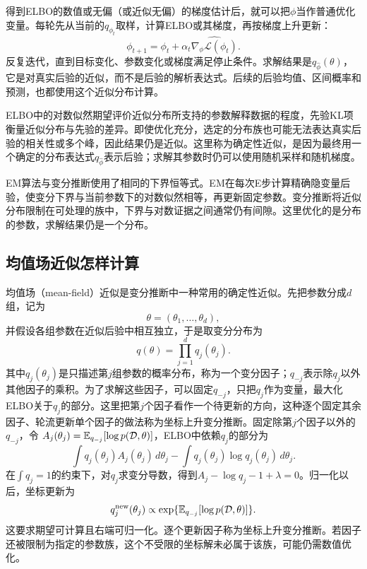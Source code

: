 得到ELBO的数值或无偏（或近似无偏）的梯度估计后，就可以把$\phi$当作普通优化变量。每轮先从当前的$q_{\phi_t}$取样，计算ELBO或其梯度，再按梯度上升更新：
\begin{equation}
 \phi_{t+1}=\phi_t+\alpha_t\widehat{\nabla_\phi\mathcal L(\phi_t)}.
\end{equation}
反复迭代，直到目标变化、参数变化或梯度满足停止条件。求解结果是$q_{\hat\phi}(\theta)$，它是对真实后验的近似，而不是后验的解析表达式。后续的后验均值、区间概率和预测，也都使用这个近似分布计算。

ELBO中的对数似然期望评价近似分布所支持的参数解释数据的程度，先验KL项衡量近似分布与先验的差异。即使优化充分，选定的分布族也可能无法表达真实后验的相关性或多个峰，因此结果仍是近似。这里称为确定性近似，是因为最终用一个确定的分布表达式$q_{\hat\phi}$表示后验；求解其参数时仍可以使用随机采样和随机梯度。

EM算法与变分推断使用了相同的下界恒等式。EM在每次E步计算精确隐变量后验，使变分下界与当前参数下的对数似然相等，再更新固定参数。变分推断将近似分布限制在可处理的族中，下界与对数证据之间通常仍有间隙。这里优化的是分布的参数，求解结果仍是一个分布。

\subsection{均值场近似怎样计算}
均值场（mean-field）近似是变分推断中一种常用的确定性近似。先把参数分成$d$组，记为
\begin{equation}
 \theta=(\theta_1,\ldots,\theta_d),
\end{equation}
并假设各组参数在近似后验中相互独立，于是取变分分布为
\begin{equation}
 q(\theta)=\prod_{j=1}^d q_j(\theta_j).
\end{equation}
其中$q_j(\theta_j)$是只描述第$j$组参数的概率分布，称为一个变分因子；$q_{-j}$表示除$q_j$以外其他因子的乘积。为了求解这些因子，可以固定$q_{-j}$，只把$q_j$作为变量，最大化ELBO关于$q_j$的部分。这里把第$j$个因子看作一个待更新的方向，这种逐个固定其余因子、轮流更新单个因子的做法称为坐标上升变分推断。固定除第$j$个因子以外的$q_{-j}$，令
$A_j(\theta_j)=\mathbb{E}_{q_{-j}}[\log p(\mathcal D,\theta)]$，ELBO中依赖$q_j$的部分为
\begin{equation}
 \int q_j(\theta_j)A_j(\theta_j)\,d\theta_j
 -\int q_j(\theta_j)\log q_j(\theta_j)\,d\theta_j.
\end{equation}
在$\int q_j=1$的约束下，对$q_j$求变分导数，得到$A_j-\log q_j-1+\lambda=0$。归一化以后，坐标更新为
\begin{equation}
 q_j^{\mathrm{new}}(\theta_j)\propto
 \exp\{\mathbb{E}_{q_{-j}}[\log p(\mathcal D,\theta)]\}.
\end{equation}
这要求期望可计算且右端可归一化。逐个更新因子称为坐标上升变分推断。若因子还被限制为指定的参数族，这个不受限的坐标解未必属于该族，可能仍需数值优化。

